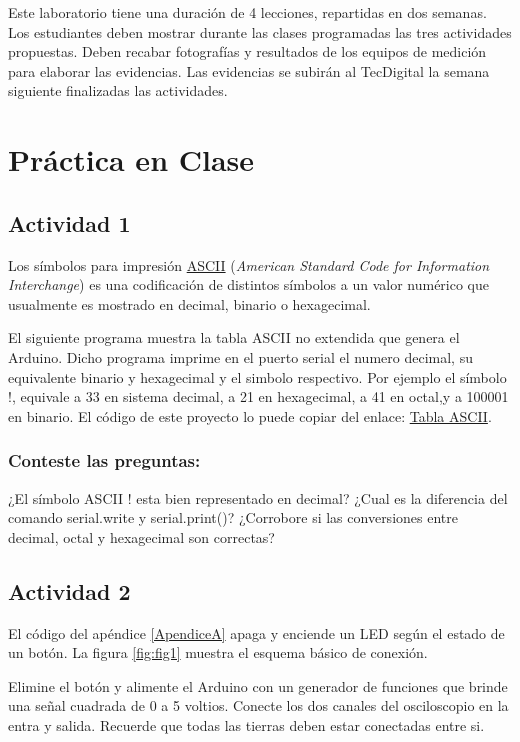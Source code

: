Este laboratorio tiene una duración de 4 lecciones, repartidas en dos semanas. Los estudiantes deben mostrar durante las clases programadas las tres actividades propuestas. Deben recabar fotografías y resultados de los equipos de medición para elaborar las evidencias. Las evidencias se subirán al TecDigital la semana siguiente finalizadas las actividades.

\section{Práctica en Clase}

\subsection{Actividad 1}
Los símbolos  para impresión \href{https://es.wikipedia.org/wiki/ASCII}{ASCII} (\textit{American Standard Code for Information Interchange}) es una codificación de distintos símbolos a un valor numérico que usualmente es mostrado en decimal, binario o hexagecimal.

El siguiente programa muestra la tabla ASCII no extendida que genera el Arduino. Dicho programa imprime en el puerto serial el numero decimal, su equivalente binario y hexagecimal y el simbolo respectivo. Por ejemplo el símbolo !, equivale a 33 en sistema decimal, a 21 en hexagecimal, a 41 en octal,y a 100001 en binario. El código de este proyecto lo puede copiar del enlace: \href{https://docs.arduino.cc/built-in-examples/communication/ASCIITable}{Tabla ASCII}.
 
\subsubsection{Conteste las preguntas:}
¿El símbolo ASCII ! esta bien representado en decimal?
¿Cual es la diferencia del comando serial.write y serial.print()?
¿Corrobore si las conversiones entre decimal, octal y hexagecimal son correctas?


\subsection{Actividad 2}
El  código del apéndice \ref{ApendiceA} apaga y enciende un LED según el estado de un botón. La figura \ref{fig:fig1} muestra el esquema básico de conexión.

Elimine el botón y alimente el Arduino con un generador de funciones que brinde una señal cuadrada de 0 a 5 voltios. Conecte los dos canales del osciloscopio en la  entra y salida. Recuerde que todas las tierras deben estar conectadas entre si. 

